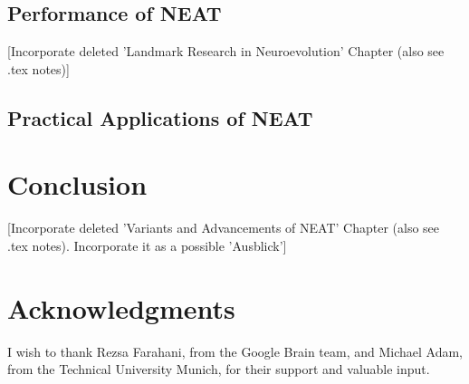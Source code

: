 \documentclass[journal, a4paper]{IEEEtran}
\begin{document}
\subsection{Performance of NEAT} \label{sec:neat_performance}

[Incorporate deleted 'Landmark Research in Neuroevolution' Chapter (also see .tex notes)]

\blindtext




\subsection{Practical Applications of NEAT}

\blindtext




\section{Conclusion}

[Incorporate deleted 'Variants and Advancements of NEAT' Chapter (also see .tex notes). Incorporate it as a possible 'Ausblick']

\blindtext




\section{Acknowledgments}

I wish to thank Rezsa Farahani, from the Google Brain team, and Michael Adam, from the Technical University Munich, for their support and valuable input.
\end{document}
